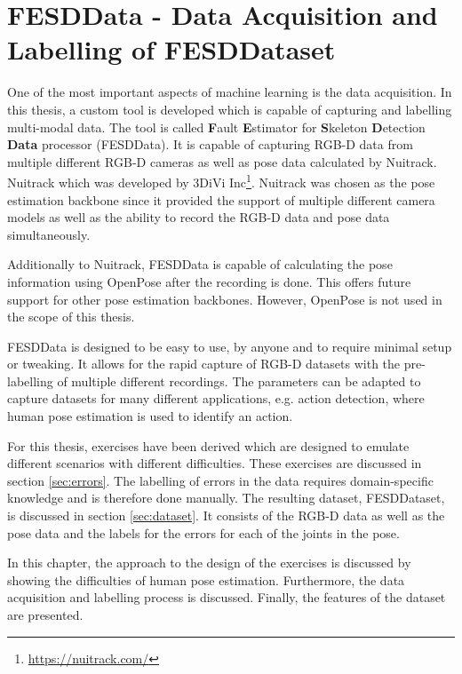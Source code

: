 \chapter[FESDData]{FESDData - Data Acquisition and Labelling of FESDDataset}
\label{sec:data_processing}

One of the most important aspects of machine learning is the data acquisition. In this thesis, a custom tool is developed which is capable of capturing and labelling multi-modal data. The tool is called \textbf{F}ault \textbf{E}stimator for \textbf{S}keleton \textbf{D}etection \textbf{Data} processor (FESDData). It is capable of capturing RGB-D data from multiple different RGB-D cameras as well as pose data calculated by Nuitrack. Nuitrack which was developed by 3DiVi Inc\footnote{\url{https://nuitrack.com/}}. Nuitrack was chosen as the pose estimation backbone since it provided the support of multiple different camera models as well as the ability to record the RGB-D data and pose data simultaneously.

Additionally to Nuitrack, FESDData is capable of calculating the pose information using OpenPose after the recording is done. This offers future support for other pose estimation backbones. However, OpenPose is not used in the scope of this thesis.

FESDData is designed to be easy to use, by anyone and to require minimal setup or tweaking. It allows for the rapid capture of RGB-D datasets with the pre-labelling of multiple different recordings. The parameters can be adapted to capture datasets for many different applications, e.g. action detection, where human pose estimation is used to identify an action. 

For this thesis, exercises have been derived which are designed to emulate different scenarios with different difficulties. These exercises are discussed in section \ref{sec:errors}. The labelling of errors in the data requires domain-specific knowledge and is therefore done manually. The resulting dataset, FESDDataset, is discussed in section \ref{sec:dataset}. It consists of the RGB-D data as well as the pose data and the labels for the errors for each of the joints in the pose.

In this chapter, the approach to the design of the exercises is discussed by showing the difficulties of human pose estimation. Furthermore, the data acquisition and labelling process is discussed. Finally, the features of the dataset are presented.






